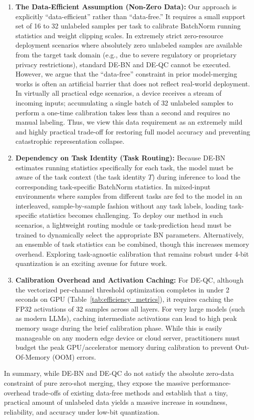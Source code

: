 \documentclass{article}
\theoremstyle{plain}
\theoremstyle{definition}
\theoremstyle{remark}
\begin{document}
\begin{enumerate}
    \item \textbf{The Data-Efficient Assumption (Non-Zero Data):} 
    Our approach is explicitly ``data-efficient'' rather than ``data-free.'' It requires a small support set of 16 to 32 unlabeled samples per task to calibrate BatchNorm running statistics and weight clipping scales. 
    In extremely strict zero-resource deployment scenarios where absolutely zero unlabeled samples are available from the target task domain (e.g., due to severe regulatory or proprietary privacy restrictions), standard DE-BN and DE-QC cannot be executed. 
    However, we argue that the ``data-free'' constraint in prior model-merging works is often an artificial barrier that does not reflect real-world deployment. In virtually all practical edge scenarios, a device receives a stream of incoming inputs; accumulating a single batch of 32 unlabeled samples to perform a one-time calibration takes less than a second and requires no manual labeling. Thus, we view this data requirement as an extremely mild and highly practical trade-off for restoring full model accuracy and preventing catastrophic representation collapse.

    \item \textbf{Dependency on Task Identity (Task Routing):}
    Because DE-BN estimates running statistics specifically for each task, the model must be aware of the task context (the task identity $T$) during inference to load the corresponding task-specific BatchNorm statistics. 
    In mixed-input environments where samples from different tasks are fed to the model in an interleaved, sample-by-sample fashion without any task labels, loading task-specific statistics becomes challenging. 
    To deploy our method in such scenarios, a lightweight routing module or task-prediction head must be trained to dynamically select the appropriate BN parameters. Alternatively, an ensemble of task statistics can be combined, though this increases memory overhead. Exploring task-agnostic calibration that remains robust under 4-bit quantization is an exciting avenue for future work.

    \item \textbf{Calibration Overhead and Activation Caching:}
    For DE-QC, although the vectorized per-channel threshold optimization completes in under 2 seconds on GPU (Table~\ref{tab:efficiency_metrics}), it requires caching the FP32 activations of 32 samples across all layers. For very large models (such as modern LLMs), caching intermediate activations can lead to high peak memory usage during the brief calibration phase. While this is easily manageable on any modern edge device or cloud server, practitioners must budget the peak GPU/accelerator memory during calibration to prevent Out-Of-Memory (OOM) errors.
\end{enumerate}

In summary, while DE-BN and DE-QC do not satisfy the absolute zero-data constraint of pure zero-shot merging, they expose the massive performance-overhead trade-offs of existing data-free methods and establish that a tiny, practical amount of unlabeled data yields a massive increase in soundness, reliability, and accuracy under low-bit quantization.
\end{document}
